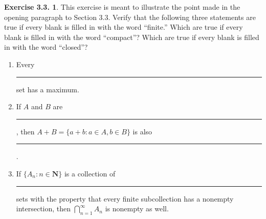 \documentclass[12pt]{article}
\theoremstyle{definition}
\theoremstyle{exercise}
\newtheorem{exercise}{Exercise 3.3.}
\theoremstyle{solution}
\newcommand{\N}{\mathbf{N}}
\begin{document}
\begin{exercise}
\label{ex:6}
    This exercise is meant to illustrate the point made in the opening paragraph to Section 3.3. Verify that the following three statements are true if every blank is filled in with the word ``finite.'' Which are true if every blank is filled in with the word ``compact''? Which are true if every blank is filled in with the word ``closed''?
    \begin{enumerate}
        \item Every \rule{1cm}{0.15mm} set has a maximum.

        \item If \( A \) and \( B \) are \rule{1cm}{0.15mm}, then \( A + B = \{ a + b : a \in A, b \in B \} \) is also \rule{1cm}{0.15mm}.

        \item If \( \{ A_n : n \in \N \} \) is a collection of \rule{1cm}{0.15mm} sets with the property that every finite subcollection has a nonempty intersection, then \( \bigcap_{n=1}^{\infty} A_n \) is nonempty as well.
    \end{enumerate}
\end{exercise}
\end{document}
